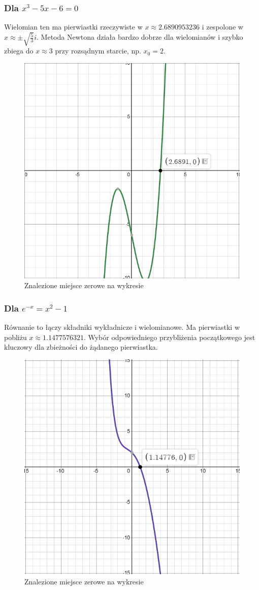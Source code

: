 \documentclass[a4paper,12pt]{article}
\begin{document}
\subsubsection{Dla $x^3 - 5x - 6 = 0$}
Wielomian ten ma pierwiastki rzeczywiste w $x \approx 2.6890953236 $ i zespolone w $x \approx \pm \sqrt{\frac{5}{3}}i$. Metoda Newtona działa bardzo dobrze dla wielomianów i szybko zbiega do $x \approx 3$ przy rozsądnym starcie, np. $x_0 = 2$.

\begin{figure}[H]
    \centering
    \includegraphics[width=0.7\linewidth]{second_solution.PNG}
    \caption{Znalezione miejsce zerowe na wykresie}
    \label{fig:first-solutions}
\end{figure}

\subsubsection{Dla $e^{-x} = x^2 - 1$}
Równanie to łączy składniki wykładnicze i wielomianowe. Ma pierwiastki w pobliżu $x \approx 1.1477576321$. Wybór odpowiedniego przybliżenia początkowego jest kluczowy dla zbieżności do żądanego pierwiastka.

\begin{figure}[H]
    \centering
    \includegraphics[width=0.7\linewidth]{third_solution.PNG}
    \caption{Znalezione miejsce zerowe na wykresie}
    \label{fig:third-solution}
\end{figure}
\end{document}
